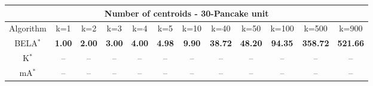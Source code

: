 \begin{tabular}{c|ccccccccccc}\toprule
\multicolumn{12}{c}{Number of centroids - 30-Pancake unit}\\ \midrule
Algorithm & k=1 & k=2 & k=3 & k=4 & k=5 & k=10 & k=40 & k=50 & k=100 & k=500 & k=900 \\ \midrule
BELA$^*$ & \textbf{1.00} & \textbf{2.00} & \textbf{3.00} & \textbf{4.00} & \textbf{4.98} & \textbf{9.90} & \textbf{38.72} & \textbf{48.20} & \textbf{94.35} & \textbf{358.72} & \textbf{521.66} \\
K$^*$ & -- & -- & -- & -- & -- & -- & -- & -- & -- & -- & -- \\
mA$^*$ & -- & -- & -- & -- & -- & -- & -- & -- & -- & -- & -- \\ \bottomrule 
\end{tabular}
